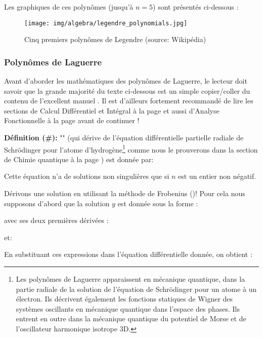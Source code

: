 	Les graphiques de ces polynômes (jusqu'à $n = 5$) sont présentés ci-dessous :
	\begin{figure}[H]
		\centering
		\texttt{[image: img/algebra/legendre\_polynomials.jpg]}
		\caption[Cinq premiers polynômes de Legendre]{Cinq premiers polynômes de Legendre (source: Wikipédia)}
	\end{figure}
	
	\subsubsection{Polynômes de Laguerre}\label{Laguerre polynomials}
	Avant d'aborder les mathématiques des polynômes de Laguerre, le lecteur doit savoir que la grande majorité du texte ci-dessous est un simple copier/coller du contenu de l'excellent manuel \cite{arfken2013mathematical}. Il est d'ailleurs fortement recommandé de lire les sections de Calcul Différentiel et Intégral à la page \pageref{differential and integral calculus} et aussi d'Analyse Fonctionnelle à la page \pageref{analyse fonctionnelle} avant de continuer !
	
	\textbf{Définition (\#\mydef):} "" (qui dérive de l'équation différentielle partielle radiale de Schrödinger pour l'atome d'hydrogène\footnote{Les polynômes de Laguerre apparaissent en mécanique quantique, dans la partie radiale de la solution de l'équation de Schrödinger pour un atome à un électron. Ils décrivent également les fonctions statiques de Wigner des systèmes oscillants en mécanique quantique dans l'espace des phases. Ils entrent en outre dans la mécanique quantique du potentiel de Morse et de l'oscillateur harmonique isotrope 3D.} comme nous le prouverons dans la section de Chimie quantique à la page \pageref{quantum chemistry non-rigid rotator}) est donnée par:
	
	Cette équation n'a de solutions non singulières que si $n$ est un entier non négatif.
	
	Dérivons une solution en utilisant la méthode de Frobenius ()! Pour cela nous supposons d'abord que la solution $y$ est donnée sous la forme :
	
	avec ses deux premières dérivées :
	
	et:
	
	En substituant ces expressions dans l'équation différentielle donnée, on obtient :
	
